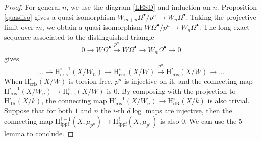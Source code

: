 \documentclass[a4paper,12pt,twoside]{report}
\newcommand{\cris}{\mathrm{cris}}
\newcommand{\fppf}{\mathrm{fppf}}
\newcommand{\dR}{\mathrm{dR}}
\newcommand{\HH}{\mathrm{H}}
\begin{document}
\begin{proof}
For general $n$, we use the diagram \ref{LESD} and induction on $n$. 
Proposition \ref{quasiiso} gives a quasi-isomorphism $W_{m+n}\Omega^{\bullet}/p^n\rightarrow W_n\Omega^{\bullet}$. 
Taking the projective limit over $m$, we obtain a quasi-isomorphism $W\Omega^{\bullet}/p^n\rightarrow W_n\Omega^{\bullet}$.
The long exact sequence associated to the distinguished triangle
\[0\rightarrow W\Omega^{\bullet} \xrightarrow{p^n} W\Omega^{\bullet} \rightarrow W_n\Omega^\bullet \rightarrow 0\]
gives \[...\rightarrow \HH^{i-1}_{\cris}(X/W_n)\rightarrow \HH^i_{\cris}(X/W)\xrightarrow{p^n}\HH^i_{\cris}(X/W) \rightarrow...\]
When $\HH^i_{\cris}(X/W)$ is torsion-free, $p^n$ is injective on it, 
and the connecting map 
$\HH^{i-1}_{\cris}(X/W_n) \rightarrow \HH^i_{\cris}(X/W)$ is $0$. 
By composing with the projection to $\HH^i_{\dR}(X/k)$, the connecting map $\HH^{i-1}_{\cris}(X/W_n)\rightarrow \HH^i_{\dR}(X/k)$ is also trivial. 
Suppose that for both $1$ and $n$ the $i$-th $d\log$ maps are injective, 
then the connecting map $\HH^{i-1}_{\fppf}(X,\mu_{p^n})\rightarrow \HH^i_{\fppf}(X,\mu_{p^1})$ is also $0$. 
We can use the 5-lemma to conclude.
\end{proof} 
\end{document}
